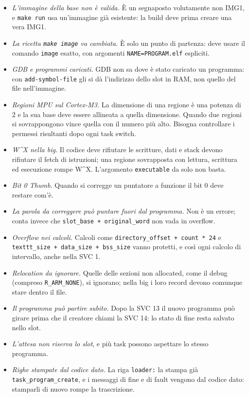 \begin{itemize}\sloppy
\item \emph{L'immagine della base non è valida.} È un segnaposto volutamente non IMG1, e \texttt{make run} usa un'immagine già esistente: la build deve prima creare una vera IMG1.
\item \emph{La ricetta \texttt{make image} va cambiata.} È solo un punto di partenza: deve usare il comando \texttt{image} esatto, con argomenti \texttt{NAME=PROGRAM.elf} espliciti.
\item \emph{GDB e programmi caricati.} GDB non sa dove è stato caricato un programma: con \texttt{add-symbol-file} gli si dà l'indirizzo dello slot in RAM, non quello del file nell'immagine.
\item \emph{Regioni MPU sul Cortex-M3.} La dimensione di una regione è una potenza di 2 e la sua base deve essere allineata a quella dimensione. Quando due regioni si sovrappongono vince quella con il numero più alto. Bisogna controllare i permessi risultanti dopo ogni task switch.
\item \emph{W\textasciicircum{}X nella big.} Il codice deve rifiutare le scritture, dati e stack devono rifiutare il fetch di istruzioni; una regione sovrapposta con lettura, scrittura ed esecuzione rompe W\textasciicircum{}X. L'argomento \texttt{executable} da solo non basta.
\item \emph{Bit 0 Thumb.} Quando si corregge un puntatore a funzione il bit 0 deve restare com'è.
\item \emph{La parola da correggere può puntare fuori dal programma.} Non è un errore; conta invece che \texttt{slot\_base + original\_word} non vada in overflow.
\item \emph{Overflow nei calcoli.} Calcoli come \texttt{directory\_offset + count * 24} e \texttt{texttt\_size + data\_size + bss\_size} vanno protetti, e così ogni calcolo di intervallo, anche nella SVC 1.
\item \emph{Relocation da ignorare.} Quelle delle sezioni non allocated, come il debug (compreso \texttt{R\_ARM\_NONE}), si ignorano; nella big i loro record devono comunque stare dentro il file.
\item \emph{Il programma può partire subito.} Dopo la SVC 13 il nuovo programma può girare prima che il creatore chiami la SVC 14: lo stato di fine resta salvato nello slot.
\item \emph{L'attesa non riserva lo slot}, e più task possono aspettare lo stesso programma.
\item \emph{Righe stampate dal codice dato.} La riga \texttt{loader:} la stampa già \texttt{task\_program\_create}, e i messaggi di fine e di fault vengono dal codice dato: stamparli di nuovo rompe la trascrizione.

\end{itemize}
